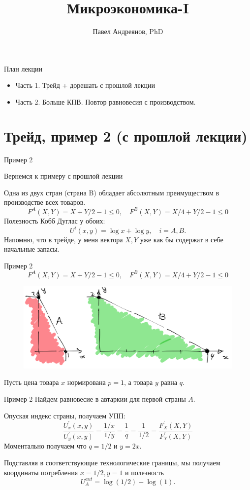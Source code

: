 \documentclass{beamer}
\title{
Микроэкономика-I
}
\author{
Павел Андреянов, PhD
}
\begin{document}
\maketitle

\begin{frame}{План лекции}
\begin{itemize}
  \item Часть 1. Трейд + дорешать с прошлой лекции
  \item Часть 2. Больше КПВ. Повтор равновесия с производством.
\end{itemize}
\end{frame}

\section{Трейд, пример 2 (с прошлой лекции)}

\begin{frame}{Пример 2}

Вернемся к примеру с прошлой лекции

Одна из двух стран (страна B) обладает абсолютным преимуществом в производстве всех товаров.
$$ F^A(X,Y) = X + Y/2 - 1 \leqslant 0, \quad F^B(X,Y) = X/4 + Y/2 - 1 \leqslant 0$$
Полезность Кобб Дуглас у обоих: $$U^i(x,y) = \log x + \log y, \quad i= {A,B}.$$
Напомню, что \alert{в трейде, у меня вектора $X, Y$ уже как бы содержат в себе начальные запасы.}
\end{frame}

\begin{frame}{Пример 2}
$$ F^A(X,Y) = X + Y/2 - 1 \leqslant 0, \quad F^B(X,Y) = X/4 + Y/2 - 1 \leqslant 0$$
\begin{figure}[hbt]
\centering
\includegraphics[width=1 \textwidth]{pic2.png}
\end{figure}
Пусть цена товара $x$ нормирована $p=1$, а товара $y$ равна $q$.
\end{frame}

\begin{frame}{Пример 2}
Найдем равновесие в автаркии для первой страны $A$. 

Опуская индекс страны, получаем УПП:
$$ \frac{U^{'}_x(x,y)}{U^{'}_y(x,y)} = \frac{1/x}{1/y} = \frac{1}{q} = \frac{1}{1/2} = \frac{F^{'}_X(X,Y)}{F^{'}_Y(X,Y)}$$
Моментально получаем что $q = 1/2$ и $y = 2x$.

Подставляя в соответствующие технологические границы, мы получаем координаты потребления $x = 1/2, y = 1$ и полезность $$U^{aut}_A = \log(1/2) + \log(1).$$

\end{frame}
\end{document}
